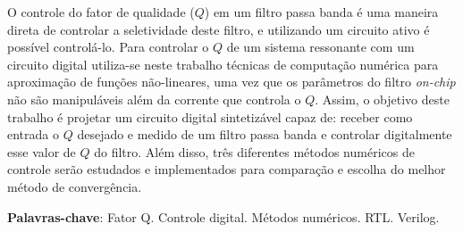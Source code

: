 \begin{resumo}

 O controle do fator de qualidade ($Q$) em um filtro passa banda é uma maneira direta de controlar a seletividade deste filtro, e utilizando um circuito ativo é possível controlá-lo. Para controlar o $Q$ de um sistema ressonante com um circuito digital utiliza-se neste trabalho técnicas de computação numérica para aproximação de funções não-lineares, uma vez que os parâmetros do filtro \textit{on-chip} não são manipuláveis além da corrente que controla o $Q$. Assim, o objetivo deste trabalho é projetar um circuito digital sintetizável capaz de: receber como entrada o $Q$  desejado e medido de um filtro passa banda e controlar digitalmente esse valor de $Q$ do filtro. Além disso, três diferentes métodos numéricos de controle serão estudados e implementados para comparação e escolha do melhor método de convergência.
 

 \vspace{\onelineskip}
    
 \noindent
 \textbf{Palavras-chave}: Fator Q. Controle digital. Métodos numéricos. RTL. Verilog.
\end{resumo}
